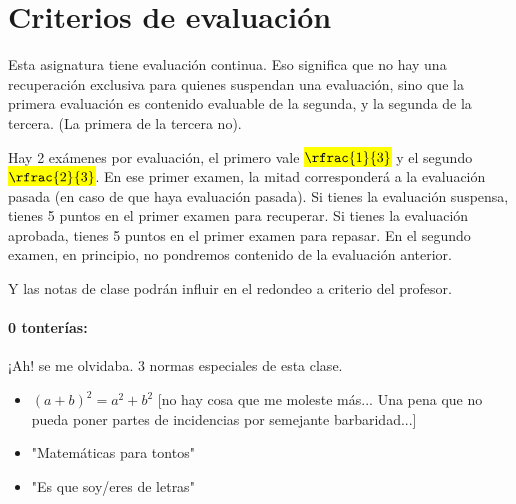 \documentclass[palatino,nosec]{Docencia}
\begin{document}
\section{Criterios de evaluación}

Esta asignatura tiene evaluación continua. Eso significa que no hay una recuperación exclusiva para quienes suspendan una evaluación, sino que la primera evaluación es contenido evaluable de la segunda, y la segunda de la tercera.
%
(La primera de la tercera no).

Hay 2 exámenes por evaluación, el primero vale \hl{$\rfrac{1}{3}$} y el segundo \hl{$\rfrac{2}{3}$}. 
%
En ese primer examen, la mitad corresponderá a la evaluación pasada (en caso de que haya evaluación pasada).
%
Si tienes la evaluación suspensa, tienes 5 puntos en el primer examen para recuperar.
%
Si tienes la evaluación aprobada, tienes 5 puntos en el primer examen para repasar.
%
En el segundo examen, en principio, no pondremos contenido de la evaluación anterior.

Y las notas de clase podrán influir en el redondeo a criterio del profesor. 

\paragraph{0 tonterías:} ¡Ah! se me olvidaba. 3 normas especiales de esta clase.

\begin{itemize}
	\item $(a+b)^2 = a^2 + b^2$ [no hay cosa que me moleste más... Una pena que no pueda poner partes de incidencias por semejante barbaridad...]
	\item "Matemáticas para tontos"
	\item "Es que soy/eres de letras"
\end{itemize}








\printindex
\end{document}
